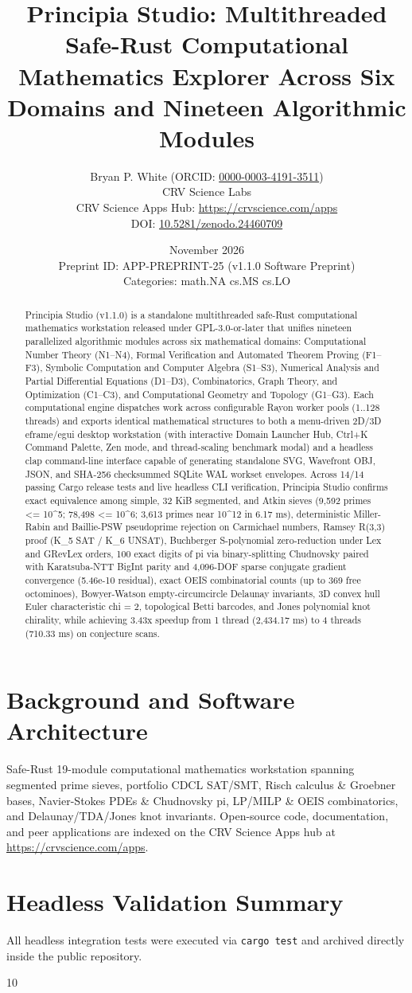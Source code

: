 \documentclass[10pt,letterpaper]{article}
\title{\textbf{Principia Studio: Multithreaded Safe-Rust Computational Mathematics Explorer Across Six Domains and Nineteen Algorithmic Modules}}
\author{Bryan P. White (ORCID: \href{https://orcid.org/0000-0003-4191-3511}{0000-0003-4191-3511}) \\ CRV Science Labs \\ \small CRV Science Apps Hub: \url{https://crvscience.com/apps} \\ \small DOI: \href{https://doi.org/10.5281/zenodo.24460709}{10.5281/zenodo.24460709}}
\date{November 2026 \\ \small Preprint ID: APP-PREPRINT-25 (v1.1.0 Software Preprint) \\ \small Categories: math.NA \textbullet{} cs.MS \textbullet{} cs.LO}
\begin{document}
\maketitle

\begin{abstract}
Principia Studio (v1.1.0) is a standalone multithreaded safe-Rust computational mathematics workstation released under GPL-3.0-or-later that unifies nineteen parallelized algorithmic modules across six mathematical domains: Computational Number Theory (N1--N4), Formal Verification and Automated Theorem Proving (F1--F3), Symbolic Computation and Computer Algebra (S1--S3), Numerical Analysis and Partial Differential Equations (D1--D3), Combinatorics, Graph Theory, and Optimization (C1--C3), and Computational Geometry and Topology (G1--G3). Each computational engine dispatches work across configurable Rayon worker pools (1..128 threads) and exports identical mathematical structures to both a menu-driven 2D/3D eframe/egui desktop workstation (with interactive Domain Launcher Hub, Ctrl+K Command Palette, Zen mode, and thread-scaling benchmark modal) and a headless clap command-line interface capable of generating standalone SVG, Wavefront OBJ, JSON, and SHA-256 checksummed SQLite WAL workset envelopes. Across 14/14 passing Cargo release tests and live headless CLI verification, Principia Studio confirms exact equivalence among simple, 32 KiB segmented, and Atkin sieves (9,592 primes <= 10\textasciicircum{}5; 78,498 <= 10\textasciicircum{}6; 3,613 primes near 10\textasciicircum{}12 in 6.17 ms), deterministic Miller-Rabin and Baillie-PSW pseudoprime rejection on Carmichael numbers, Ramsey R(3,3) proof (K\_5 SAT / K\_6 UNSAT), Buchberger S-polynomial zero-reduction under Lex and GRevLex orders, 100 exact digits of pi via binary-splitting Chudnovsky paired with Karatsuba-NTT BigInt parity and 4,096-DOF sparse conjugate gradient convergence (5.46e-10 residual), exact OEIS combinatorial counts (up to 369 free octominoes), Bowyer-Watson empty-circumcircle Delaunay invariants, 3D convex hull Euler characteristic chi = 2, topological Betti barcodes, and Jones polynomial knot chirality, while achieving 3.43x speedup from 1 thread (2,434.17 ms) to 4 threads (710.33 ms) on conjecture scans.
\end{abstract}

\section{Background and Software Architecture}
Safe-Rust 19-module computational mathematics workstation spanning segmented prime sieves, portfolio CDCL SAT/SMT, Risch calculus \& Groebner bases, Navier-Stokes PDEs \& Chudnovsky pi, LP/MILP \& OEIS combinatorics, and Delaunay/TDA/Jones knot invariants. Open-source code, documentation, and peer applications are indexed on the CRV Science Apps hub at \url{https://crvscience.com/apps}.

\section{Headless Validation Summary}
All headless integration tests were executed via \texttt{cargo test} and archived directly inside the public repository.

\begin{thebibliography}{10}

\end{thebibliography}
\end{document}
